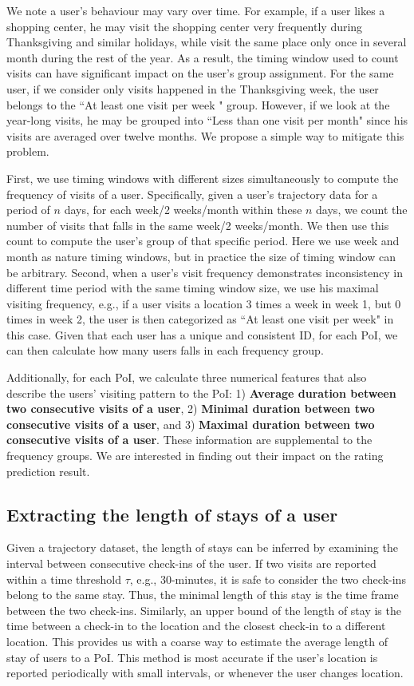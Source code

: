 We note a user's behaviour may vary over time. For example, if a user likes a shopping center, he may visit the shopping center very frequently during Thanksgiving and similar holidays, while visit the same place only once in several month during the rest of the year. As a result, the timing window used to count visits can have significant impact on the user's group assignment. For the same user, if we consider only visits happened in the Thanksgiving week, the user belongs to the ``At least one visit per week " group. However, if we look at the year-long visits, he may be grouped into ``Less than one visit per month" since his visits are averaged over twelve months. We propose a simple way to mitigate this problem.

First, we use timing windows with different sizes simultaneously to compute the frequency of visits of a user. Specifically, given a user's trajectory data for a period of $n$ days, for each week/2 weeks/month within these $n$ days, we count the number of visits that falls in the same week/2 weeks/month. We then use this count to compute the user's group of that specific period. Here we use week and month as nature timing windows, but in practice the size of timing window can be arbitrary. Second, when a user's visit frequency demonstrates inconsistency in different time period with the same timing window size, we use his maximal visiting frequency, e.g., if a user visits a location 3 times a week in week 1, but 0 times in week 2, the user is then categorized as ``At least one visit per week" in this case. Given that each user has a unique and consistent ID, for each PoI, we can then calculate how many users falls in each frequency group.

Additionally, for each PoI, we calculate three numerical features that also describe the users' visiting pattern to the PoI: 1) \textbf{Average duration between two consecutive visits of a user}, 2) \textbf{Minimal duration between two consecutive visits of a user}, and 3) \textbf{Maximal duration between two consecutive visits of a user}. These information are supplemental to the frequency groups. We are interested in finding out their impact on the rating prediction result.

\subsection{Extracting the length of stays of a user}

Given a trajectory dataset, the length of stays can be inferred by examining the interval between consecutive check-ins of the user. If two visits are reported within a time threshold $\tau$, e.g., 30-minutes, it is safe to consider the two check-ins belong to the same stay. Thus, the minimal length of this stay is the time frame between the two check-ins. Similarly, an upper bound of the length of stay is the time between a check-in to the location and the closest check-in to a different location. This provides us with a coarse way to estimate the average length of stay of users to a PoI. This method is most accurate if the user's location is reported periodically with small intervals, or whenever the user changes location.

